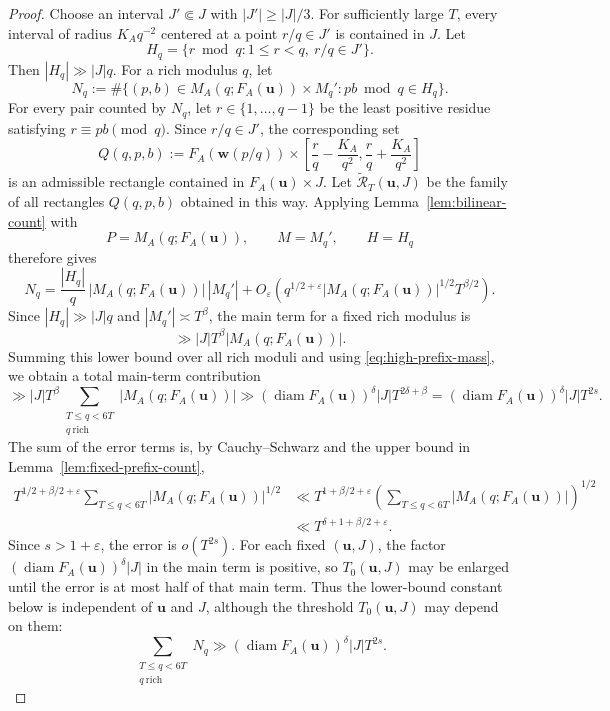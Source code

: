 \documentclass[10pt,a4paper]{amsart}
\newcommand{\diam}{\operatorname{diam}}
\newcommand{\eps}{\varepsilon}
\begin{document}
\begin{proof}
Choose an interval $J'\Subset J$ with $|J'|\ge |J|/3$.  For sufficiently
large $T$, every interval of radius $K_Aq^{-2}$ centered at a point
$r/q\in J'$ is contained in $J$.  Let
$$
 H_q=\{r\bmod q:1\le r<q,\ r/q\in J'\}.
$$
Then $|H_q|\gg |J|q$.  For a rich modulus $q$, let
$$
 N_q:=\#\{(p,b)\in M_A(q;F_A(\mathbf{u}))\times M_q': pb\bmod q\in H_q\}.
$$
For every pair counted by $N_q$, let $r\in\{1,\ldots,q-1\}$ be the least
positive residue satisfying $r\equiv pb\pmod q$.  Since $r/q\in J'$, the corresponding set
$$
 Q(q,p,b):=F_A(\mathbf{w}(p/q))\times
 \left[\frac rq-\frac{K_A}{q^2},\frac rq+\frac{K_A}{q^2}\right]
$$
is an admissible rectangle contained in $F_A(\mathbf{u})\times J$.  Let
$\widetilde{\mathcal R}_T(\mathbf{u},J)$ be the family of all rectangles $Q(q,p,b)$
obtained in this way.  Applying Lemma~\ref{lem:bilinear-count} with
$$
 P=M_A(q;F_A(\mathbf{u})),\qquad M=M_q',\qquad H=H_q
$$
therefore gives
$$
 N_q=\frac{|H_q|}{q}\,|M_A(q;F_A(\mathbf{u}))|\,|M_q'|
 +O_\eps\!\left(q^{1/2+\eps}|M_A(q;F_A(\mathbf{u}))|^{1/2}T^{\beta/2}\right).
$$
Since $|H_q|\gg |J|q$ and $|M_q'|\asymp T^\beta$, the main term for a
fixed rich modulus is
$$
 \gg |J|T^\beta|M_A(q;F_A(\mathbf{u}))|.
$$
Summing this lower bound over all rich moduli and using
\eqref{eq:high-prefix-mass}, we obtain a total main-term contribution
$$
 \gg |J|T^\beta\sum_{\substack{T\le q<6T\\ q\ \mathrm{rich}}}|M_A(q;F_A(\mathbf{u}))|
 \gg (\diam F_A(\mathbf{u}))^\delta |J|T^{2\delta+\beta}
 =(\diam F_A(\mathbf{u}))^\delta |J|T^{2s}.
$$
The sum of the error terms is, by Cauchy--Schwarz and the upper bound in
Lemma~\ref{lem:fixed-prefix-count},
\begin{align*}
 T^{1/2+\beta/2+\eps}
 \sum_{T\le q<6T}|M_A(q;F_A(\mathbf{u}))|^{1/2}
 &\ll T^{1+\beta/2+\eps}
 \left(\sum_{T\le q<6T}|M_A(q;F_A(\mathbf{u}))|\right)^{1/2}\\
 &\ll T^{\delta+1+\beta/2+\eps}.
\end{align*}
Since $s>1+\eps$, the error is $o(T^{2s})$.  For each fixed
$(\mathbf{u},J)$, the factor $(\diam F_A(\mathbf{u}))^\delta|J|$ in the
main term is positive, so $T_0(\mathbf{u},J)$ may be enlarged until the error
is at most half of that main term.  Thus the lower-bound constant below is
independent of $\mathbf{u}$ and $J$, although the threshold $T_0(\mathbf{u},J)$
may depend on them:
$$
 \sum_{\substack{T\le q<6T\\q\ \mathrm{rich}}}N_q
 \gg (\diam F_A(\mathbf{u}))^\delta |J|T^{2s}.
$$


\end{proof}
\end{document}
